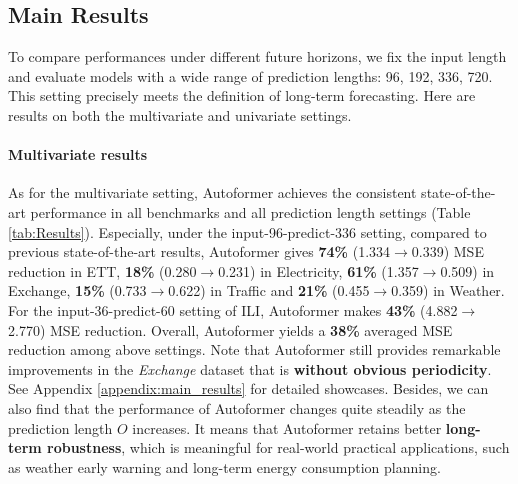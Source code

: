 \subsection{Main Results}
To compare performances under different future horizons, we fix the input length and evaluate models with a wide range of prediction lengths: 96, 192, 336, 720. This setting precisely meets the definition of long-term forecasting. Here are results on both the multivariate and univariate settings.

\vspace{-5pt}
\paragraph{Multivariate results}
As for the multivariate setting, Autoformer achieves the consistent state-of-the-art performance in all benchmarks and all prediction length settings (Table \ref{tab:Results}). Especially, under the input-96-predict-336 setting, compared to previous state-of-the-art results, Autoformer gives \textbf{74\%} (1.334$\to$0.339) MSE reduction in ETT, \textbf{18\%} (0.280$\to$0.231) in Electricity, \textbf{61\%} (1.357$\to$0.509) in Exchange, \textbf{15\%} (0.733$\to$0.622) in Traffic and \textbf{21\%} (0.455$\to$0.359) in Weather. For the input-36-predict-60 setting of ILI, Autoformer makes \textbf{43\%} (4.882$\to$2.770) MSE reduction. Overall, Autoformer yields a \textbf{38\%} averaged MSE reduction among above settings.
Note that Autoformer still provides remarkable improvements in the \textit{Exchange} dataset that is \textbf{without obvious periodicity}. 
See Appendix \ref{appendix:main_results} for detailed showcases.
Besides, we can also find that the performance of Autoformer changes quite steadily as the prediction length $O$ increases. It means that Autoformer retains better \textbf{long-term robustness}, which is meaningful for real-world practical applications, such as weather early warning and long-term energy consumption planning.

\vspace{-5pt}
